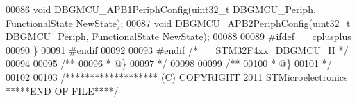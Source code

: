 \begin{DoxyCode}
00086 \textcolor{keywordtype}{void} DBGMCU_APB1PeriphConfig(uint32\_t DBGMCU\_Periph, FunctionalState NewState);
00087 \textcolor{keywordtype}{void} DBGMCU_APB2PeriphConfig(uint32\_t DBGMCU\_Periph, FunctionalState NewState);
00088 
00089 \textcolor{preprocessor}{#}\textcolor{preprocessor}{ifdef} \_\_cplusplus
00090 \}
00091 \textcolor{preprocessor}{#}\textcolor{preprocessor}{endif}
00092 
00093 \textcolor{preprocessor}{#}\textcolor{preprocessor}{endif} \textcolor{comment}{/* \_\_STM32F4xx\_DBGMCU\_H */}
00094 
00095 \textcolor{comment}{/**}
00096 \textcolor{comment}{  * @\}}
00097 \textcolor{comment}{  */}
00098 
00099 \textcolor{comment}{/**}
00100 \textcolor{comment}{  * @\}}
00101 \textcolor{comment}{  */}
00102 
00103 \textcolor{comment}{/******************* (C) COPYRIGHT 2011 STMicroelectronics *****END OF FILE****/}
\end{DoxyCode}
